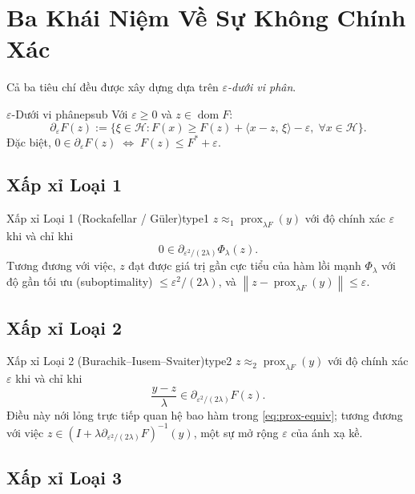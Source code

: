 \documentclass[12pt, a4paper]{article}
\newcommand{\HH}{\mathcal{H}}
\newcommand{\prox}{\operatorname{prox}}
\newcommand{\dom}{\operatorname{dom}}
\newcommand{\norm}[1]{\left\|#1\right\|}
\newcommand{\inner}[2]{\langle #1,\,#2\rangle}
\begin{document}
\section{Ba Khái Niệm Về Sự Không Chính Xác}

Cả ba tiêu chí đều được xây dựng dựa trên \emph{$\varepsilon$-dưới vi phân}.

\begin{definition}{$\varepsilon$-Dưới vi phân}{epsub}
Với $\varepsilon\ge 0$ và $z\in\dom F$:
\[
  \partial_\varepsilon F(z)
  :=\bigl\{\xi\in\HH : F(x)\ge F(z)+\inner{x-z}{\xi}-\varepsilon,
  \;\forall x\in\HH\bigr\}.
\]
Đặc biệt, $0\in\partial_\varepsilon F(z)\;\Leftrightarrow\;
F(z)\le F^*+\varepsilon$.
\end{definition}



\subsection{Xấp xỉ Loại 1}

\begin{definition}{Xấp xỉ Loại 1 (Rockafellar / G\"{u}ler)}{type1}
$z\approx_1\prox_{\lambda F}(y)$ với độ chính xác $\varepsilon$ khi và chỉ khi
\[
  0\in\partial_{\varepsilon^2/(2\lambda)}\Phi_\lambda(z).
  \tag{AT1}
\]
Tương đương với việc, $z$ đạt được giá trị gần cực tiểu của hàm lồi mạnh $\Phi_\lambda$
với độ gần tối ưu (suboptimality) $\le\varepsilon^2/(2\lambda)$, và $\norm{z-\prox_{\lambda F}(y)}\le\varepsilon$.
\end{definition}


\subsection{Xấp xỉ Loại 2}

\begin{definition}{Xấp xỉ Loại 2 (Burachik--Iusem--Svaiter)}{type2}
$z\approx_2\prox_{\lambda F}(y)$ với độ chính xác $\varepsilon$ khi và chỉ khi
\[
  \frac{y-z}{\lambda}\in\partial_{\varepsilon^2/(2\lambda)}F(z).
  \tag{AT2}
\]
Điều này nới lỏng trực tiếp quan hệ bao hàm trong \eqref{eq:prox-equiv};
tương đương với việc $z\in(I+\lambda\partial_{\varepsilon^2/(2\lambda)}F)^{-1}(y)$,
một sự mở rộng $\varepsilon$ của ánh xạ kề.
\end{definition}


\subsection{Xấp xỉ Loại 3}
\end{document}
